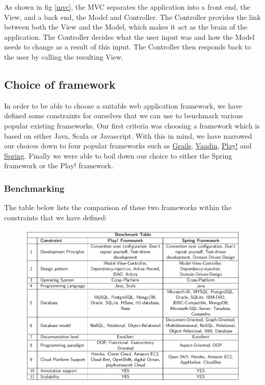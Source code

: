 As shown in fig \ref{mvc}, the MVC separates the application into a front end, the View, and a back end, the Model and Controller. The Controller provides the link between both the View and the Model, which makes it act as the brain of the application. The Controller decides what the user input was and how the Model needs to change as a result of this input\cite{codinghorror}. The Controller then responds back to the user by calling the resulting View.

\subsection{Choice of framework}
In order to be able to choose a suitable web application framework, we have defined some  constraints for ourselves that we can use to benchmark various popular existing frameworks. Our first criteria was choosing a framework which is based on either Java, Scala or Javascript. With this in mind, we have narrowed our choices down to four popular frameworks such as \href{https://grails.org/}{Grails}, \href{https://vaadin.com/home}{Vaadin}, \href{https://www.playframework.com/}{Play!} and \href{http://projects.spring.io/spring-framework/}{Spring}. Finally we were able to boil down our choice to either the Spring framework or the Play! framework.
\subsubsection{Benchmarking}
 The table below lists the comparison of these two frameworks within the constraints that we have defined:\\

\begin{figure}[h]
\centering
\includegraphics[scale=0.5]{./img/benchmark.png}	
\end{figure}


